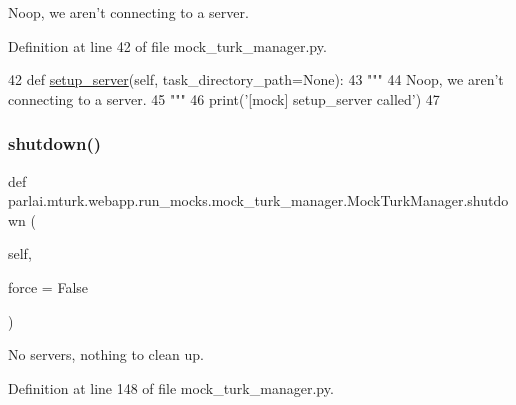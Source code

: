 \begin{DoxyVerb}Noop, we aren't connecting to a server.
\end{DoxyVerb}
 

Definition at line 42 of file mock\+\_\+turk\+\_\+manager.\+py.


\begin{DoxyCode}
42     \textcolor{keyword}{def }\hyperlink{namespaceparlai_1_1chat__service_1_1services_1_1messenger_1_1server__utils_afb56b04206cd0f42384438f1ac6d9cda}{setup\_server}(self, task\_directory\_path=None):
43         \textcolor{stringliteral}{"""}
44 \textcolor{stringliteral}{        Noop, we aren't connecting to a server.}
45 \textcolor{stringliteral}{        """}
46         print(\textcolor{stringliteral}{'[mock] setup\_server called'})
47 
\end{DoxyCode}
\mbox{\label{classparlai_1_1mturk_1_1webapp_1_1run__mocks_1_1mock__turk__manager_1_1MockTurkManager_a2aaa4c749bab8b987163b22620821dad}} 
\subsubsection{\texorpdfstring{shutdown()}{shutdown()}}
{\footnotesize\ttfamily def parlai.\+mturk.\+webapp.\+run\+\_\+mocks.\+mock\+\_\+turk\+\_\+manager.\+Mock\+Turk\+Manager.\+shutdown (\begin{DoxyParamCaption}\item[{}]{self,  }\item[{}]{force = {\ttfamily False} }\end{DoxyParamCaption})}

\begin{DoxyVerb}No servers, nothing to clean up.
\end{DoxyVerb}
 

Definition at line 148 of file mock\+\_\+turk\+\_\+manager.\+py.


